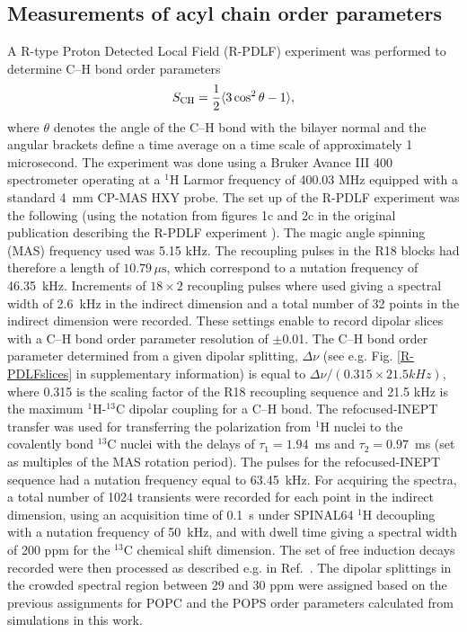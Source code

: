 \documentclass[journal=jctcce,manuscript=article]{achemso}
\begin{document}
\subsection{Measurements of acyl chain order parameters}
A R-type Proton Detected Local Field (R-PDLF) experiment was performed to determine C--H bond order
parameters
\begin{equation}\label{OPequation}
  S_{\rm{CH}}=\frac{1}{2}\langle3\cos^2\theta-1\rangle,
\end{equation}
  where $\theta$ denotes the angle of the C--H bond
with the bilayer normal and the angular brackets define a time average on a time scale of approximately 1 microsecond.
The experiment was done using a Bruker Avance III 400 spectrometer operating at a $^1$H Larmor frequency of 400.03 MHz
equipped with a standard 4~mm CP-MAS HXY probe. The set up of the R-PDLF experiment was the following
(using the notation from figures 1c and 2c in the original publication describing the R-PDLF experiment \cite{dvinskikh04}).
The magic angle spinning (MAS) frequency used was 5.15 kHz. The recoupling pulses in the R18 blocks had
therefore a length of $10.79 \, \mu \mathrm{s}$, which correspond to a nutation frequency of 46.35~kHz. Increments of $18 \times 2$ recoupling
pulses where used giving a spectral width of 2.6~kHz in the indirect dimension and a total number of 32 points in
the indirect dimension were recorded. These settings enable to record dipolar slices with a C--H bond order parameter
resolution of $\pm$0.01. The C--H bond order parameter determined from a given dipolar
splitting, $\Delta\nu$ (see e.g. Fig. \ref{R-PDLFslices} in supplementary information) is equal to $\Delta\nu/(0.315\times21.5 kHz)$, where 0.315 is
the scaling factor of the R18 recoupling sequence and 21.5 kHz is the maximum $^1$H-$^{13}$C dipolar coupling for a C--H bond.
The refocused-INEPT transfer \cite{morris79,burum80} 
was used for transferring the polarization from $^1$H nuclei to the covalently bond $^{13}$C nuclei with the delays of $\tau_1 = 1.94$~ms and $\tau_2 = 0.97$~ms
(set as multiples of the MAS rotation period). The pulses for the refocused-INEPT sequence had a nutation frequency equal to 63.45~kHz.
For acquiring the spectra, a total number of 1024 transients were recorded for each point in the indirect dimension, using an acquisition
time of 0.1~s under SPINAL64 $^1$H decoupling \cite{fung00} with a nutation frequency of 50~kHz, and with dwell time giving a spectral
width of 200 ppm for the $^{13}$C chemical shift dimension. The set of free induction decays recorded were then processed as
described e.g. in Ref.~. The dipolar splittings in the crowded spectral region
between 29 and 30 ppm were assigned based on the previous assignments for POPC \cite{ferreira13} 
and the POPS order parameters calculated from simulations in this work.
\end{document}
